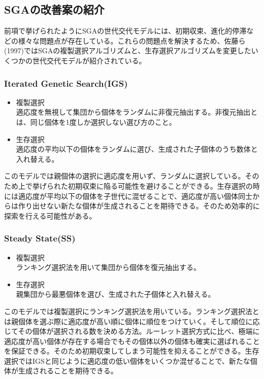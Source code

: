 \subsection{SGAの改善案の紹介}
前項で挙げられたようにSGAの世代交代モデルには、初期収束、進化的停滞などの様々な問題点が存在している。これらの問題点を解決するため、佐藤ら(1997)ではSGAの複製選択アルゴリズムと、生存選択アルゴリズムを変更したいくつかの世代交代モデルが紹介されている。

\subsubsection{Iterated Genetic Search(IGS)}
\begin{itemize}
\item{複製選択}\\
適応度を無視して集団から個体をランダムに非復元抽出する。非復元抽出とは、同じ個体を1度しか選択しない選び方のこと。
\item{生存選択}\\
適応度の平均以下の個体をランダムに選び、生成された子個体のうち数体と入れ替える。
\end{itemize}
このモデルでは親個体の選択に適応度を用いず、ランダムに選択している。そのため上で挙げられた初期収束に陥る可能性を避けることができる。生存選択の時には適応度が平均以下の個体を子世代に混ぜることで、適応度が高い個体同士からは作り出せない新たな個体が生成されることを期待できる。そのため効率的に探索を行える可能性がある。

\subsubsection{Steady State(SS)}
\begin{itemize}
\item{複製選択}\\
ランキング選択法を用いて集団から個体を復元抽出する。
\item{生存選択}\\
親集団から最悪個体を選び、生成された子個体と入れ替える。
\end{itemize}
このモデルでは複製選択にランキング選択法を用いている。ランキング選択法とは親個体を選ぶ際に適応度が高い順に個体に順位をつけていく。そして順位に応じてその個体が選択される数を決める方法。ルーレット選択方式に比べ、極端に適応度が高い個体が存在する場合でもその個体以外の個体も確実に選ばれることを保証できる。そのため初期収束してしまう可能性を抑えることができる。生存選択ではIGSと同じように適応度の低い個体をいくつか混ぜることで、新たな個体が生成されることを期待できる。

